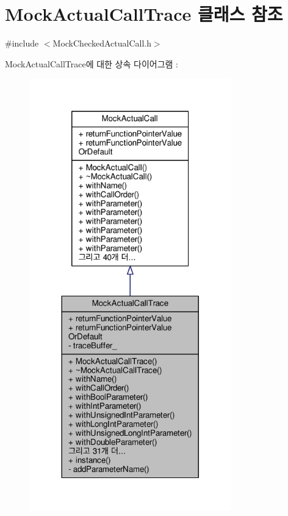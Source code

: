 \hypertarget{class_mock_actual_call_trace}{}\section{Mock\+Actual\+Call\+Trace 클래스 참조}
\label{class_mock_actual_call_trace}


{\ttfamily \#include $<$Mock\+Checked\+Actual\+Call.\+h$>$}



Mock\+Actual\+Call\+Trace에 대한 상속 다이어그램 \+: 
\nopagebreak
\begin{figure}[H]
\begin{center}
\leavevmode
\includegraphics[width=248pt]{class_mock_actual_call_trace__inherit__graph}
\end{center}
\end{figure}


